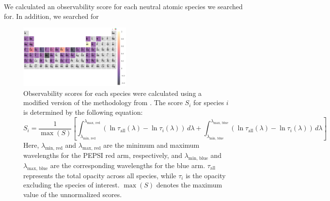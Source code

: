 \documentclass[twocolumn]{aastex631}
\begin{document}
            We calculated an observability score for each neutral atomic species we searched for. In addition, we searched for
            \begin{figure}
                \centering
                \includegraphics[width=0.5\textwidth]{observability_scores.png}
                \caption{Observability scores for each species were calculated using a modified version of the methodology from \citet{Kesseli2022}. The score \(S_i\) for species \(i\) is determined by the following equation:
                \begin{equation}
                S_i = \frac{1}{\max(S)} \left[ \int_{\lambda_\text{min, red}}^{\lambda_\text{max, red}} \left( \ln \tau_\text{all}(\lambda) - \ln \tau_i(\lambda) \right) \, d\lambda + \int_{\lambda_\text{min, blue}}^{\lambda_\text{max, blue}} \left( \ln \tau_\text{all}(\lambda) - \ln \tau_i(\lambda) \right) \, d\lambda \right]
                \end{equation}
                Here, \(\lambda_\text{min, red}\) and \(\lambda_\text{max, red}\) are the minimum and maximum wavelengths for the PEPSI red arm, respectively, and \(\lambda_\text{min, blue}\) and \(\lambda_\text{max, blue}\) are the corresponding wavelengths for the blue arm. \(\tau_\text{all}\) represents the total opacity across all species, while \(\tau_i\) is the opacity excluding the species of interest. \(\max(S)\) denotes the maximum value of the unnormalized scores.}
            \end{figure}

            
            
\end{document}
